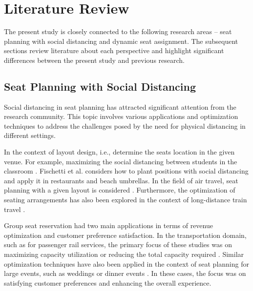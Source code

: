 \section{Literature Review}

The present study is closely connected to the following research areas -- seat planning with social distancing and dynamic seat assignment. The subsequent sections review literature about each perspective and highlight significant differences between the present study and previous research.


\subsection{Seat Planning with Social Distancing}
Social distancing in seat planning has attracted significant attention from the research community. This topic involves various applications and optimization techniques to address the challenges posed by the need for physical distancing in different settings. 


In the context of layout design, i.e., determine the seats location in the given venue. For example, maximizing the social distancing between students in the classroom \cite{bortolete2022support}. Fischetti et al.\cite{fischetti2023safe} considers how to plant positions with social distancing and apply it in restaurants and beach umbrellas. In the field of air travel, seat planning with a given layout is considered \cite{ghorbani2020model, salari2022social}. Furthermore, the optimization of seating arrangements has also been explored in the context of long-distance train travel \cite{haque2022optimization}. 

Group seat reservation had two main applications in terms of revenue optimization and customer preference satisfaction. In the transportation domain, such as for passenger rail services, the primary focus of these studies was on maximizing capacity utilization or reducing the total capacity required \cite{clausen2010off, deplano2019offline}. Similar optimization techniques have also been applied in the context of seat planning for large events, such as weddings or dinner events \cite{lewis2016creating}. In these cases, the focus was on satisfying customer preferences and enhancing the overall experience.


